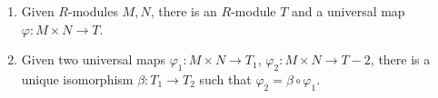 \begin{enumerate}[label=(\roman*)]
	\item Given $R$-modules $M, N$, there is an $R$-module $T$ and a universal map
		$\varphi\colon M\times N\to T$.
	\item Given two universal maps $\varphi_1\colon M\times N\to T_1$,
		$\varphi_2\colon M\times N\to T-2$, there is a unique isomorphism
		$\beta\colon T_1\to T_2$ such that $\varphi_2 = \beta \circ \varphi_1$.
\end{enumerate}
